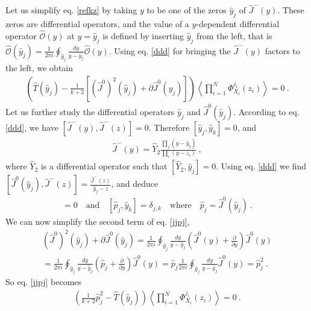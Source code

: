 \documentclass[12pt, a4paper, notitlepage, twoside]{report}
\numberwithin{equation}{section}
\theoremstyle{break}
\begin{document}
Let us simplify eq. \eqref{refkz} by taking $y$ to be one of the zeros $\hat{y}_j$ of $ \hat{J}^-(y)$.
These zeros are differential operators, and the value of a $y$-dependent differential operator $\hat{\mathcal{O}}(y)$ at $y=\hat{y}_j$ is defined by inserting $\hat{y}_j$ from the left, that is $ \hat{\mathcal{O}}(\hat{y}_j) = \frac{1}{2\pi i}\oint_{\hat{y}_j} \frac{dy}{y-\hat{y}_j} \hat{\mathcal{O}}(y) $.
Using eq. \eqref{ddd} for bringing the $\hat{J}^-(y)$ factors to the left, we obtain
\begin{align}
 \left( \hat{T}(\hat{y}_j) -\frac{1}{k+2}\left[(\hat{J}^0)^2(\hat{y}_j) + \partial \hat{J}^0(\hat{y}_j)\right] \right)  \left\langle \prod_{i=1}^N \Phi^{j_i}_{X_i}(z_i)\right\rangle= 0 \ .
\label{jjpj}
\end{align}
Let us further study the differential operators $\hat{y}_j$ and $\hat{J}^0(\hat{y}_j)$.
According to eq. \eqref{ddd}, we have $[\hat{J}^-(y),\hat{J}^-(z)]=0$.
Therefore $[\hat{y}_j,\hat{y}_k]=0$, and
\begin{align}
 \boxed{\hat{J}^-(y)  = \hat{Y}_2 \frac{\prod_{j}(y-\hat{y}_j)}{\prod_i(y-z_i)}}\ ,
\label{djm}
\end{align}
where $\hat{Y}_2$ is a differential operator such that $[\hat{Y}_2,\hat{y}_j]=0$.
Using eq. \eqref{ddd} we find $[\hat{J}^0(\hat{y}_j),\hat{J}^-(z)] = \frac{\hat{J}^-(z)}{\hat{y}_j-z}$, and deduce
\begin{align}
 [\hat{p}_j,\hat{Y}_2]=0 \quad \text{and} \quad [\hat{p}_j,\hat{y}_k]=\delta_{j,k} \quad \text{where} \quad \hat{p}_j = \hat{J}^0(\hat{y}_j)\ .
\label{pyd}
\end{align}
We can now simplify the second term of eq. \eqref{jjpj},
\begin{multline}
 (\hat{J}^0)^2(\hat{y}_j) + \partial \hat{J}^0(\hat{y}_j) = \frac{1}{2\pi i} \oint_{\hat{y}_j} \frac{dy}{y-\hat{y}_j}\left(\hat{J}^0(y) +{\frac{\partial}{\partial y}} \right) \hat{J}^0(y) \\
 = \frac{1}{2\pi i} \oint_{\hat{y}_j} \frac{dy}{y-\hat{y}_j}\left(\hat{p}_j +{\frac{\partial}{\partial y}} \right) \hat{J}^0(y)
 = \hat{p}_j \frac{1}{2\pi i} \oint_{\hat{y}_j} \frac{dy}{y-\hat{y}_j} \hat{J}^0(y) = \hat{p}_j^2\ .
\end{multline}
So eq. \eqref{jjpj} becomes 
\begin{align}
 \boxed{\left(\frac{1}{k+2}\hat{p}_j^2 -\hat{T}(\hat{y}_j)\right) \left\langle \prod_{i=1}^N \Phi^{j_i}_{X_i}(z_i)\right\rangle= 0 }\ .
\label{ppdz}
\end{align}
\end{document}
